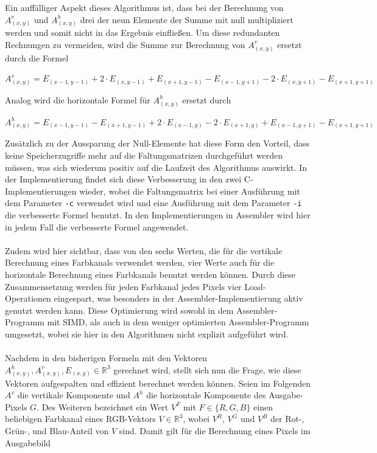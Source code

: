 \documentclass[course=asp]{aspdoc}
\begin{document}
\noindent Ein auffälliger Aspekt dieses Algorithmus ist, dass bei der Berechnung von $A_{(x,y)}^v$ und $A_{(x,y)}^h$ drei der neun Elemente der Summe mit null multipliziert werden und somit nicht in das Ergebnis einfließen. Um diese redundanten Rechnungen zu vermeiden, wird die Summe zur Berechnung von $A_{(x,y)}^v$ ersetzt durch die Formel
\begin{center}
$A_{(x,y)}^v=E_{(x-1,y-1)}+2 \cdot E_{(x,y-1)}+E_{(x+1,y-1)}-E_{(x-1,y+1)}-2 \cdot E_{(x,y+1)}-E_{(x+1,y+1)}$
\end{center}
Analog wird die horizontale Formel für $A_{(x,y)}^{h}$ ersetzt durch
\begin{center}
$A_{(x,y)}^h=E_{(x-1,y-1)}-E_{(x+1,y-1)}+2 \cdot E_{(x-1,y)}-2 \cdot E_{(x+1,y)}+E_{(x-1,y+1)}-E_{(x+1,y+1)}$
\end{center}
Zusätzlich zu der Aussparung der Null-Elemente hat diese Form den Vorteil, dass keine Speicherzugriffe mehr auf die Faltungsmatrizen durchgeführt werden müssen, was sich wiederum positiv auf die Laufzeit des Algorithmus auswirkt. In der Implementierung findet sich diese Verbesserung in den zwei C-Implementierungen wieder, wobei die Faltungsmatrix bei einer Ausführung mit dem Parameter \texttt{-c} verwendet wird und eine Ausführung mit dem Parameter \texttt{-i} die verbesserte Formel benutzt. In den Implementierungen in Assembler wird hier in jedem Fall die verbesserte Formel angewendet.\\\\
Zudem wird hier sichtbar, dass von den sechs Werten, die für die vertikale Berechnung eines Farbkanals verwendet werden, vier Werte auch für die horizontale Berechnung eines Farbkanals benutzt werden können. Durch diese Zusammensetzung werden für jeden Farbkanal jedes Pixels vier Load-Operationen eingespart, was besonders in der Assembler-Implementierung aktiv genutzt werden kann. Diese Optimierung wird sowohl in dem Assembler-Programm mit SIMD, als auch in dem weniger optimierten Assembler-Programm umgesetzt, wobei sie hier in den Algorithmen nicht explizit aufgeführt wird.\\\\
Nachdem in den bisherigen Formeln mit den Vektoren $A_{(x,y)}^h,A_{(x,y)}^v,E_{(x,y)} \in \mathbb{R}^3$ gerechnet wird, stellt sich nun die Frage, wie diese Vektoren aufgespalten und effizient berechnet werden können. Seien im Folgenden $A^v$ die vertikale Komponente und $A^h$ die horizontale Komponente des Ausgabe-Pixels  $G$. Des Weiteren bezeichnet ein Wert $V^F$ mit $F \in \{R, G, B\}$ einen beliebigen Farbkanal eines RGB-Vektors $V \in \mathbb{R}^3$, wobei $V^R$, $V^G$ und $V^B$ der Rot-, Grün-, und Blau-Anteil von $V$ sind. Damit gilt für die Berechnung eines Pixels im Ausgabebild
\end{document}

